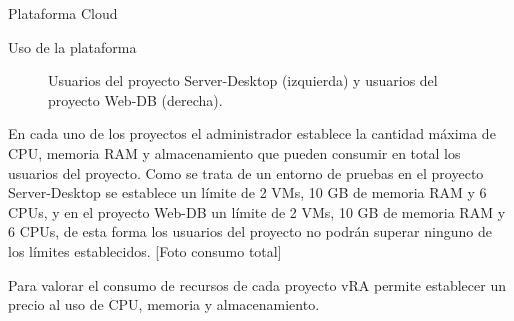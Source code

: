 \begin{subsection}{Plataforma Cloud}
\begin{subsubsection}{Uso de la plataforma}
\begin{figure}[h]
            \caption{Usuarios del proyecto Server-Desktop (izquierda) y usuarios del proyecto Web-DB (derecha).}
            \label{fig:project-users}
        \end{figure}
        \FloatBarrier
        En cada uno de los proyectos el administrador establece la cantidad máxima de CPU, memoria RAM y almacenamiento que pueden consumir en total los usuarios del proyecto. Como se trata de un entorno de pruebas en el proyecto Server-Desktop se establece un límite de 2 VMs, 10 GB de memoria RAM y 6 CPUs, y en el proyecto Web-DB un límite de 2 VMs, 10 GB de memoria RAM y 6 CPUs, de esta forma los usuarios del proyecto no podrán superar ninguno de los límites establecidos.
        [Foto consumo total]
        
        Para valorar el consumo de recursos de cada proyecto vRA permite establecer un precio al uso de CPU, memoria y almacenamiento.


\end{subsubsection}
\end{subsection}
